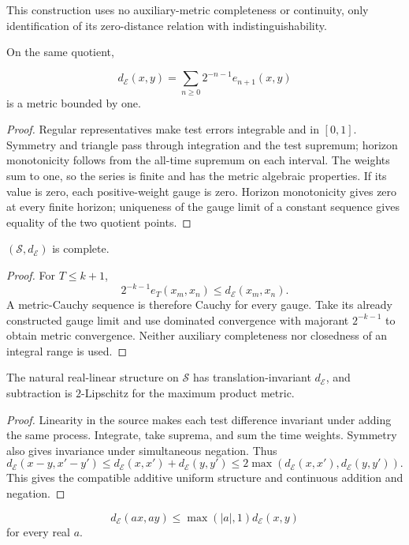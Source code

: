 This construction uses no auxiliary-metric completeness or continuity,
only identification of its zero-distance relation with indistinguishability.
\begin{proposition}
On the same quotient,

\[
 d_{\mathcal E}(x,y)=\sum_{n\geq0}2^{-n-1}e_{n+1}(x,y)
\]
 is a metric bounded
by one.
\end{proposition}
\begin{proof}
Regular representatives make test errors integrable and in $[0,1]$.
Symmetry and triangle pass through integration and the test supremum;
horizon monotonicity follows from the all-time supremum on each interval.
The weights sum to one, so the series is finite and has the metric algebraic
properties. If its value is zero, each positive-weight gauge is zero.
Horizon monotonicity gives zero at every finite horizon; uniqueness of the
gauge limit of a constant sequence gives equality of the two quotient points.
\end{proof}
\begin{proposition}
$(\mathcal S,d_{\mathcal E})$ is complete.
\end{proposition}
\begin{proof}
For $T\leq k+1$,
\[
 2^{-k-1}e_T(x_m,x_n)\leq d_{\mathcal E}(x_m,x_n).
\]
A metric-Cauchy sequence is therefore Cauchy for every gauge.
Take its already constructed gauge limit and use dominated convergence
with majorant $2^{-k-1}$ to obtain metric convergence.
Neither auxiliary completeness nor closedness of an integral range is used.
\end{proof}
\begin{proposition}
The natural real-linear structure on $\mathcal S$ has translation-invariant
$d_{\mathcal E}$, and subtraction is $2$-Lipschitz for the maximum product metric.
\end{proposition}
\begin{proof}
Linearity in the source makes each test difference invariant under adding
the same process. Integrate, take suprema, and sum the time weights.
Symmetry also gives invariance under simultaneous negation. Thus
\[
 d_{\mathcal E}(x-y,x'-y')\leq d_{\mathcal E}(x,x')+d_{\mathcal E}(y,y')
 \leq2\max(d_{\mathcal E}(x,x'),d_{\mathcal E}(y,y')).
\]
This gives the compatible additive uniform structure and continuous addition
and negation.
\end{proof}
\begin{proposition}

\[
 d_{\mathcal E}(ax,ay)\leq\max(|a|,1)d_{\mathcal E}(x,y)
\]
 for every real $a$.
\end{proposition}
